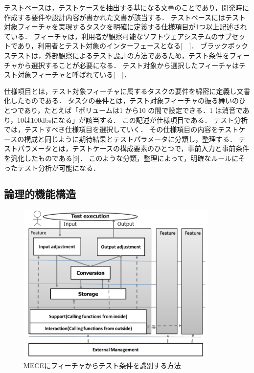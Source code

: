 テストベースは，テストケースを抽出する基になる文書のことであり，開発時に作成する要件や設計内容が書かれた文書が該当する．
テストベースにはテスト対象フィーチャを実現するタスクを明確に定義する仕様項目が1つ以上記述されている．
フィーチャは，利用者が観察可能なソフトウェアシステムのサブセットであり，利用者とテスト対象のインターフェースとなる[　]．
ブラックボックステストは，外部観察によるテスト設計の方法であるため，テスト条件をフィーチャから選択することが必要になる．
テスト対象から選択したフィーチャはテスト対象フィーチャと呼ばれている[　]．

仕様項目とは，テスト対象フィーチャに属するタスクの要件を綿密に定義し文書化したものである．
タスクの要件とは，テスト対象フィーチャの振る舞いのひとつであり，たとえば「ボリュームは1 から10 の間で設定できる．1 は消音であり，10は100dbsになる」が該当する．
この記述が仕様項目である．
テスト分析では，テストすべき仕様項目を選択していく．
その仕様項目の内容をテストケースの構成と同じように期待結果とテストパラメータに分類し，整理する．
テストパラメータとは，テストケースの構成要素のひとつで，事前入力と事前条件を汎化したものである[9]．
このような分類，整理によって，明確なルールにそったテスト分析が可能になる．

\subsection{論理的機能構造}

\begin{figure}[htbp]
  \begin{center}
	\includegraphics[width=10cm]{./image/D-3-Fig3.png}
	\caption{MECEにフィーチャからテスト条件を識別する方法}
	\label{fig:D-3-Fig3}
  \end{center}
\end{figure}

